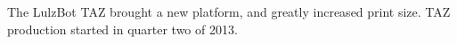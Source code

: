 %
%
%
%
%

The LulzBot TAZ brought a new platform, and greatly increased print size.
TAZ production started in quarter two of 2013.


%
%
%
%

